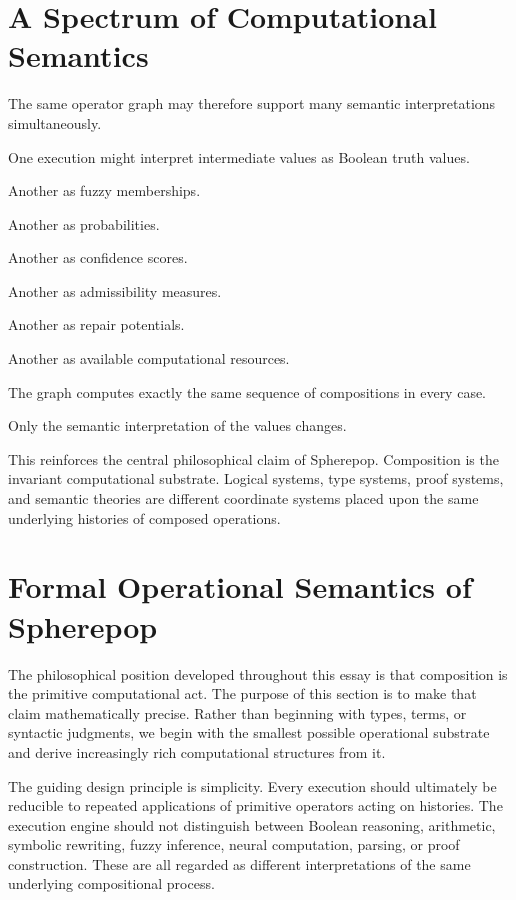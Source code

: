 \documentclass[12pt,oneside]{article}
\begin{document}
\section{A Spectrum of Computational Semantics}

The same operator graph may therefore support many semantic interpretations simultaneously.

One execution might interpret intermediate values as Boolean truth values.

Another as fuzzy memberships.

Another as probabilities.

Another as confidence scores.

Another as admissibility measures.

Another as repair potentials.

Another as available computational resources.

The graph computes exactly the same sequence of compositions in every case.

Only the semantic interpretation of the values changes.

This reinforces the central philosophical claim of Spherepop. Composition is the invariant computational substrate. Logical systems, type systems, proof systems, and semantic theories are different coordinate systems placed upon the same underlying histories of composed operations.

\section{Formal Operational Semantics of Spherepop}

The philosophical position developed throughout this essay is that composition is the primitive computational act. The purpose of this section is to make that claim mathematically precise. Rather than beginning with types, terms, or syntactic judgments, we begin with the smallest possible operational substrate and derive increasingly rich computational structures from it.

The guiding design principle is simplicity. Every execution should ultimately be reducible to repeated applications of primitive operators acting on histories. The execution engine should not distinguish between Boolean reasoning, arithmetic, symbolic rewriting, fuzzy inference, neural computation, parsing, or proof construction. These are all regarded as different interpretations of the same underlying compositional process.
\end{document}
